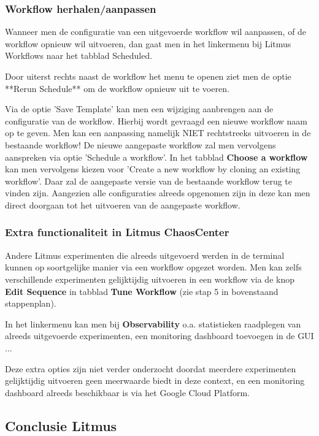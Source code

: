 \subsubsection{Workflow herhalen/aanpassen}

Wanneer men de configuratie van een uitgevoerde workflow wil aanpassen, of de workflow opnieuw wil uitvoeren, dan gaat men in het linkermenu bij Litmus Workflows naar het tabblad Scheduled.

Door uiterst rechts naast de workflow het menu te openen ziet men de optie **Rerun Schedule** om de workflow opnieuw uit te voeren.

Via de optie 'Save Template' kan men een wijziging aanbrengen aan de configuratie van de workflow. Hierbij wordt gevraagd een nieuwe workflow naam op te geven. Men kan een aanpassing namelijk NIET rechtstreeks uitvoeren in de bestaande workflow! De nieuwe aangepaste workflow zal men vervolgens aanspreken via optie 'Schedule a workflow'. In het tabblad {\bf Choose a workflow} kan men vervolgens kiezen voor 'Create a new workflow by cloning an existing workflow'. Daar zal de aangepaste versie van de bestaande workflow terug te vinden zijn. Aangezien alle configuraties alreeds opgenomen zijn in deze kan men direct doorgaan tot het uitvoeren van de aangepaste workflow. 

\subsubsection{Extra functionaliteit in Litmus ChaosCenter}

Andere Litmus experimenten die alreeds uitgevoerd werden in de terminal kunnen op soortgelijke manier via een workflow opgezet worden. Men kan zelfs verschillende experimenten gelijktijdig uitvoeren in een workflow via de knop {\bf Edit Sequence} in tabblad {\bf Tune Workflow} (zie stap 5 in bovenstaand stappenplan). 

In het linkermenu kan men bij {\bf Observability} o.a. statistieken raadplegen van alreeds uitgevoerde experimenten, een monitoring dashboard toevoegen in de GUI ...

Deze extra opties zijn niet verder onderzocht doordat meerdere experimenten gelijktijdig uitvoeren geen meerwaarde biedt in deze context, en een monitoring dashboard alreeds beschikbaar is via het Google Cloud Platform. 

\subsection{Conclusie Litmus}

